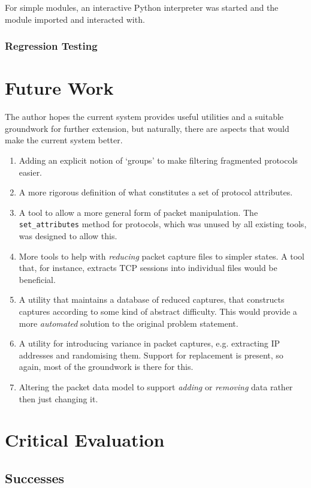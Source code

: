 \documentclass[10pt,a4paper,notitlepage]{report}
\begin{document}
For simple modules, an interactive Python interpreter was started and the module imported and interacted with.
\subsection{Regression Testing}

\chapter{Future Work}
The author hopes the current system provides useful utilities and a suitable groundwork for further extension, but naturally, there are aspects that would make the current system better.
\begin{enumerate}[label=\roman*)]
\item Adding an explicit notion of `groups' to make filtering fragmented protocols easier.
\item A more rigorous definition of what constitutes a set of protocol attributes.
\item A tool to allow a more general form of packet manipulation. The \texttt{set_attributes} method for protocols, which was unused by all existing tools, was designed to allow this.
\item More tools to help with \emph{reducing} packet capture files to simpler states. A tool that, for instance, extracts TCP sessions into individual files would be beneficial.
\item A utility that maintains a database of reduced captures, that constructs captures according to some kind of abstract difficulty. This would provide a more \emph{automated} solution to the original problem statement.
\item A utility for introducing variance in packet captures, e.g. extracting IP addresses and randomising them. Support for replacement is present, so again, most of the groundwork is there for this.
\item Altering the packet data model to support \emph{adding} or \emph{removing} data rather then just changing it.
\end{enumerate}

\chapter{Critical Evaluation}

\section{Successes}
\end{document}
